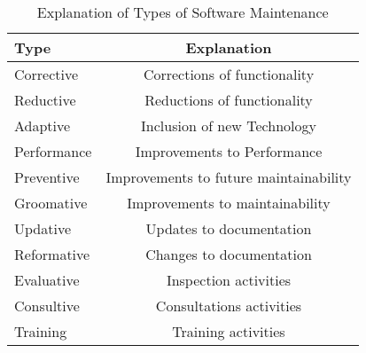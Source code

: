 \documentclass{sig-alternate}
\begin{document}
\begin{table}
       \centering
       \begin{tabular}[ht]{l|c}
              \toprule

              \textbf{Type}                              & \textbf{Explanation}    \\ \midrule
              Corrective    & Corrections of functionality                   \\ \hline
              Reductive     & Reductions of functionality                    \\ \hline
              Adaptive      & Inclusion of new Technology                    \\ \hline
              Performance   & Improvements to Performance                    \\ \hline
              Preventive    & Improvements to future maintainability         \\ \hline
              Groomative    & Improvements to maintainability                \\ \hline
              Updative      & Updates to documentation                       \\ \hline
              Reformative   & Changes to documentation                       \\ \hline
              Evaluative    & Inspection activities                          \\ \hline
              Consultive    & Consultations activities                       \\ \hline
              Training      & Training activities                            \\ 

              \bottomrule

       \end{tabular}
       \caption{Explanation of Types of Software Maintenance}
       \label{table:expl_types}
\end{table}
\end{document}
